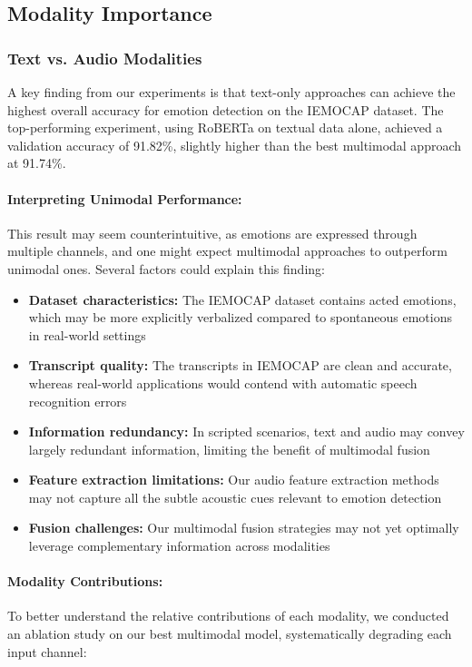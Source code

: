 \documentclass[12pt]{article}
\begin{document}
\subsection{Modality Importance}
\subsubsection{Text vs. Audio Modalities}
A key finding from our experiments is that text-only approaches can achieve the highest overall accuracy for emotion detection on the IEMOCAP dataset. The top-performing experiment, using RoBERTa on textual data alone, achieved a validation accuracy of 91.82\%, slightly higher than the best multimodal approach at 91.74\%.

\paragraph{Interpreting Unimodal Performance:}
This result may seem counterintuitive, as emotions are expressed through multiple channels, and one might expect multimodal approaches to outperform unimodal ones. Several factors could explain this finding:

\begin{itemize}
    \item \textbf{Dataset characteristics:} The IEMOCAP dataset contains acted emotions, which may be more explicitly verbalized compared to spontaneous emotions in real-world settings
    
    \item \textbf{Transcript quality:} The transcripts in IEMOCAP are clean and accurate, whereas real-world applications would contend with automatic speech recognition errors
    
    \item \textbf{Information redundancy:} In scripted scenarios, text and audio may convey largely redundant information, limiting the benefit of multimodal fusion
    
    \item \textbf{Feature extraction limitations:} Our audio feature extraction methods may not capture all the subtle acoustic cues relevant to emotion detection
    
    \item \textbf{Fusion challenges:} Our multimodal fusion strategies may not yet optimally leverage complementary information across modalities
\end{itemize}

\paragraph{Modality Contributions:}
To better understand the relative contributions of each modality, we conducted an ablation study on our best multimodal model, systematically degrading each input channel:
\end{document}
